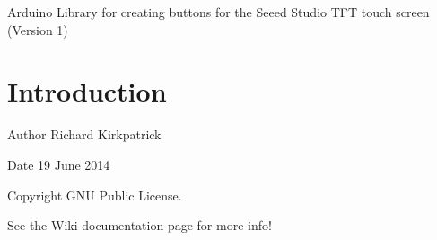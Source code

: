 Arduino Library for creating buttons for the Seeed Studio T\+F\+T touch screen (Version 1) \hypertarget{index_intro_sec}{}\section{Introduction}\label{index_intro_sec}
\begin{DoxyAuthor}{Author}
Richard Kirkpatrick 
\end{DoxyAuthor}
\begin{DoxyDate}{Date}
19 June 2014 
\end{DoxyDate}
\begin{DoxyCopyright}{Copyright}
G\+N\+U Public License.
\end{DoxyCopyright}
See the Wiki documentation page for more info! 